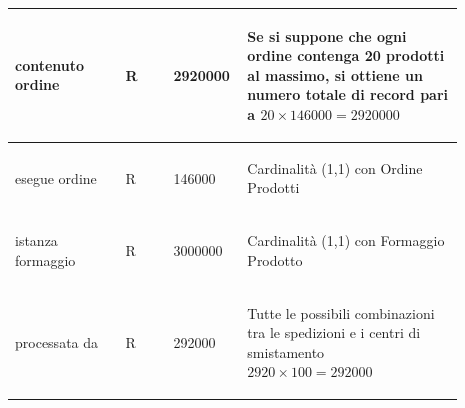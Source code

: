 \documentclass[12pt,a4paper]{article}
\begin{document}
\begin{center}
\begin{longtable}{|p{0.23\linewidth}|p{0.1\linewidth}|p{0.11\linewidth}|p{0.45\linewidth}|}
\hline
contenuto ordine
 & 
\begin{center}\vspace{-25pt}R\end{center}
 & 
\begin{center}\vspace{-25pt}2920000\end{center}
 & 
\begin{flushleft}\vspace{-25pt} Se si suppone che ogni ordine contenga 20 prodotti al massimo, si ottiene un numero totale di record pari a $20\times146000=2920000$\end{flushleft}
\\

\hline
esegue ordine
 & 
\begin{center}\vspace{-25pt}R\end{center}
 & 
\begin{center}\vspace{-25pt}146000\end{center}
 & 
\begin{flushleft}\vspace{-25pt}Cardinalità (1,1) con Ordine Prodotti\end{flushleft}
\\

\hline
istanza formaggio
 & 
\begin{center}\vspace{-25pt}R\end{center}
 & 
\begin{center}\vspace{-25pt}3000000\end{center}
 & 
\begin{flushleft}\vspace{-25pt}Cardinalità (1,1) con Formaggio Prodotto\end{flushleft}
\\

\hline
processata da
 & 
\begin{center}\vspace{-25pt}R\end{center}
 & 
\begin{center}\vspace{-25pt}292000\end{center}
 & 
\begin{flushleft}
\vspace{-25pt}Tutte le possibili combinazioni tra le spedizioni e i centri di smistamento $2920\times 100= 292000$\end{flushleft}
\\


\end{longtable}
\end{center}
\end{document}

